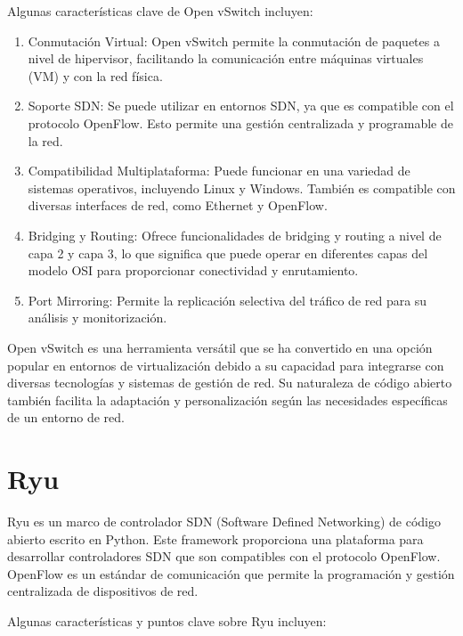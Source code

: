 \documentclass[a4paper, 12pt]{book}
\begin{document}
	Algunas características clave de Open vSwitch incluyen:
	
	\begin{enumerate}
		\item Conmutación Virtual: Open vSwitch permite la conmutación de paquetes a nivel de hipervisor, facilitando la comunicación entre máquinas virtuales (VM) y con la red física.
	
	
		\item Soporte SDN: Se puede utilizar en entornos SDN, ya que es compatible con el protocolo OpenFlow. Esto permite una gestión centralizada y programable de la red.
	
		\item Compatibilidad Multiplataforma: Puede funcionar en una variedad de sistemas operativos, incluyendo Linux y Windows. También es compatible con diversas interfaces de red, como Ethernet y OpenFlow.
	
		\item Bridging y Routing: Ofrece funcionalidades de bridging y routing a nivel de capa 2 y capa 3, lo que significa que puede operar en diferentes capas del modelo OSI para proporcionar conectividad y enrutamiento.
	
		\item Port Mirroring: Permite la replicación selectiva del tráfico de red para su análisis y monitorización.
	
	\end{enumerate}
	
	Open vSwitch es una herramienta versátil que se ha convertido en una opción popular en entornos de virtualización debido a su capacidad para integrarse con diversas tecnologías y sistemas de gestión de red. Su naturaleza de código abierto también facilita la adaptación y personalización según las necesidades específicas de un entorno de red.
	
	\section{Ryu} 
	\label{sec:ryu}
	
	
	Ryu es un marco de controlador SDN (Software Defined Networking) de código abierto escrito en Python. Este framework proporciona una plataforma para desarrollar controladores SDN que son compatibles con el protocolo OpenFlow. OpenFlow es un estándar de comunicación que permite la programación y gestión centralizada de dispositivos de red.
	
	Algunas características y puntos clave sobre Ryu incluyen:
	
\end{document}

